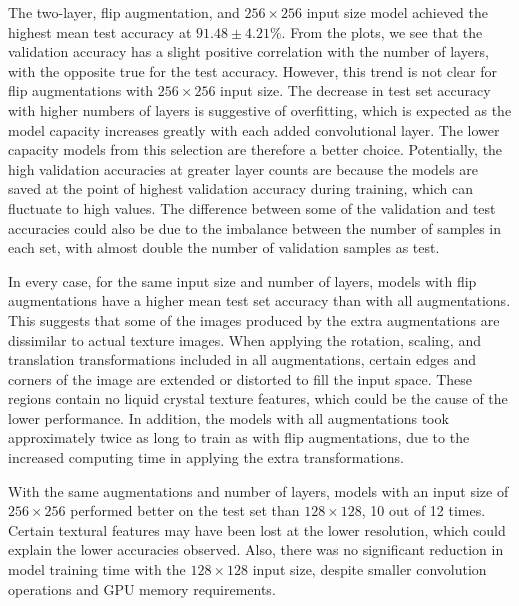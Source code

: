 \documentclass[12pt]{article}
\begin{document}
The two-layer, flip augmentation, and $256 \times 256$ input size model achieved the highest mean test accuracy at $91.48\pm4.21$\%. From the plots, we see that the validation accuracy has a slight positive correlation with the number of layers, with the opposite true for the test accuracy. However, this trend is not clear for flip augmentations with $256 \times 256$ input size. The decrease in test set accuracy with higher numbers of layers is suggestive of overfitting, which is expected as the model capacity increases greatly with each added convolutional layer. The lower capacity models from this selection are therefore a better choice. Potentially, the high validation accuracies at greater layer counts are because the models are saved at the point of highest validation accuracy during training, which can fluctuate to high values. The difference between some of the validation and test accuracies could also be due to the imbalance between the number of samples in each set, with almost double the number of validation samples as test.

In every case, for the same input size and number of layers, models with flip augmentations have a higher mean test set accuracy than with all augmentations. This suggests that some of the images produced by the extra augmentations are dissimilar to actual texture images. When applying the rotation, scaling, and translation transformations included in all augmentations, certain edges and corners of the image are extended or distorted to fill the input space. These regions contain no liquid crystal texture features, which could be the cause of the lower performance. In addition, the models with all augmentations took approximately twice as long to train as with flip augmentations, due to the increased computing time in applying the extra transformations.

With the same augmentations and number of layers, models with an input size of $256 \times 256$ performed better on the test set than $128 \times 128$, 10 out of 12 times. Certain textural features may have been lost at the lower resolution, which could explain the lower accuracies observed. Also, there was no significant reduction in model training time with the $128 \times 128$ input size, despite smaller convolution operations and GPU memory requirements.
\end{document}
